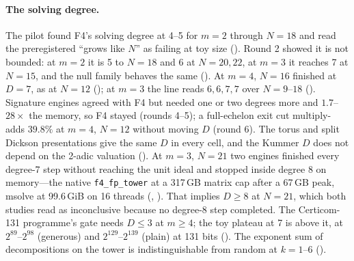 \paragraph{The solving degree.} The pilot found F4's solving degree at
4--5 for $m=2$ through $N=18$ and read the preregistered ``grows like $N$''
as failing at toy size (). Round 2
showed it is not bounded: at $m=2$ it is 5 to $N=18$ and 6 at $N=20,22$, at
$m=3$ it reaches 7 at $N=15$, and the null family behaves the same
(). At $m=4$, $N=16$ finished at
$D=7$, as at $N=12$ (); at $m=3$
the line reads $6,6,7,7$ over $N=9$--$18$
(). Signature engines agreed with
F4 but needed one or two degrees more and $1.7$--$28\times$ the memory, so F4
stayed (rounds 4--5); a full-echelon exit cut multiply-adds $39.8\%$ at
$m=4$, $N=12$ without moving $D$ (round 6). The torus and split Dickson
presentations give the same $D$ in every cell, and the Kummer $D$ does not
depend on the 2-adic valuation ().
At $m=3$, $N=21$ two engines finished every degree-7 step without reaching
the unit ideal and stopped inside degree 8 on memory---the native
\texttt{f4\_fp\_tower} at a 317\,GB matrix cap after a 67\,GB peak, msolve at
99.6\,GiB on 16 threads (,
). That implies $D\ge8$ at
$N=21$, which both studies read as inconclusive because no degree-8 step
completed. The Certicom-131 programme's gate needs $D\le3$ at $m\ge4$; the
toy plateau at 7 is above it, at $2^{89}$--$2^{98}$ (generous) and
$2^{129}$--$2^{139}$ (plain) at 131 bits
(). The exponent sum of decompositions
on the tower is indistinguishable from random at $k=1$--$6$
().

